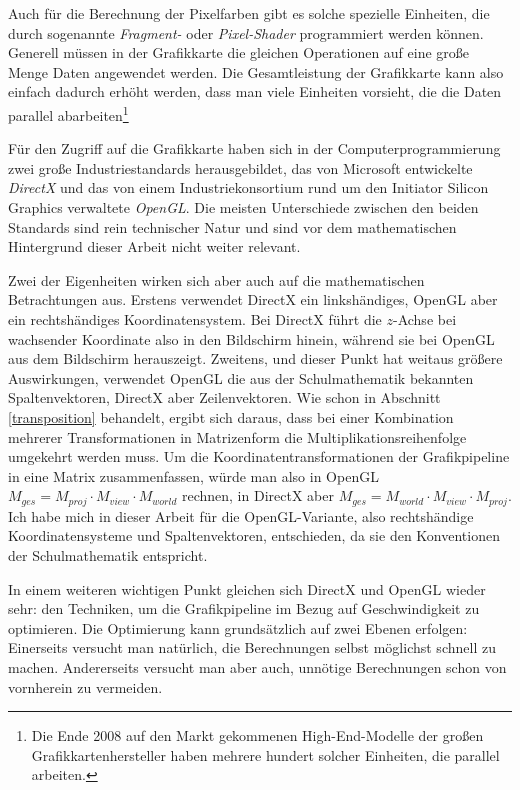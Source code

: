 Auch für die Berechnung der Pixelfarben gibt es solche spezielle Einheiten, die durch sogenannte \emph{Fragment-} oder \emph{Pixel-Shader} programmiert werden können. Generell müssen in der Grafikkarte die gleichen Operationen auf eine große Menge Daten angewendet werden. Die Gesamtleistung der Grafikkarte kann also einfach dadurch erhöht werden, dass man viele Einheiten vorsieht, die die Daten parallel abarbeiten\footnote{Die Ende 2008 auf den Markt gekommenen High-End-Modelle der großen Grafikkartenhersteller haben mehrere hundert solcher Einheiten, die parallel arbeiten. }

\label{direct3dopengl}
Für den Zugriff auf die Grafikkarte haben sich in der Computerprogrammierung zwei große Industriestandards herausgebildet, das von Microsoft entwickelte \emph{DirectX} und das von einem Industriekonsortium rund um den Initiator Silicon Graphics verwaltete \emph{OpenGL}. Die meisten Unterschiede zwischen den beiden Standards sind rein technischer Natur und sind vor dem mathematischen Hintergrund dieser Arbeit nicht weiter relevant.

Zwei der Eigenheiten wirken sich aber auch auf die mathematischen Betrachtungen aus. Erstens verwendet DirectX ein linkshändiges, OpenGL aber ein rechtshändiges Koordinatensystem. Bei DirectX führt die $z$-Achse bei wachsender Koordinate also in den Bildschirm hinein, während sie bei OpenGL aus dem Bildschirm herauszeigt. Zweitens, und dieser Punkt hat weitaus größere Auswirkungen, verwendet OpenGL die aus der Schulmathematik bekannten Spaltenvektoren, DirectX aber Zeilenvektoren. Wie schon in Abschnitt \ref{transposition} behandelt, ergibt sich daraus, dass bei einer Kombination mehrerer Transformationen in Matrizenform die Multiplikationsreihenfolge umgekehrt werden muss. Um die Koordinatentransformationen der Grafikpipeline in eine Matrix zusammenfassen, würde man also in OpenGL $M_{ges} = M_{proj} \cdot M_{view} \cdot M_{world}$ rechnen, in DirectX aber $M_{ges} = M_{world} \cdot M_{view} \cdot M_{proj}$. Ich habe mich in dieser Arbeit für die OpenGL-Variante, also rechtshändige Koordinatensysteme und Spaltenvektoren, entschieden, da sie den Konventionen der Schulmathematik entspricht.

\label{performance}
In einem weiteren wichtigen Punkt gleichen sich DirectX und OpenGL wieder sehr: den Techniken, um die Grafikpipeline im Bezug auf Geschwindigkeit zu optimieren. Die Optimierung kann grundsätzlich auf zwei Ebenen erfolgen: Einerseits versucht man natürlich, die Berechnungen selbst möglichst schnell zu machen. Andererseits versucht man aber auch, unnötige Berechnungen schon von vornherein zu vermeiden.


